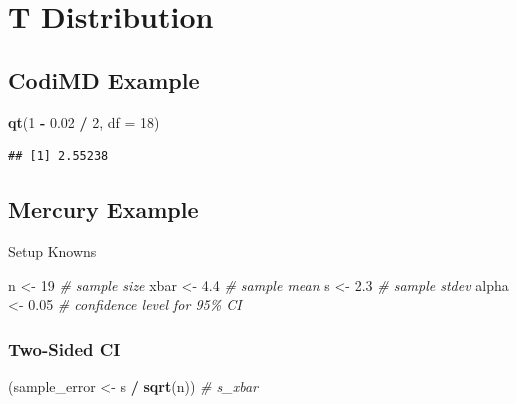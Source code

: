 \documentclass[
]{article}
\author{}
\date{\vspace{-2.5em}}
\newenvironment{Shaded}{\begin{snugshade}}{\end{snugshade}}
\newcommand{\AttributeTok}[1]{\textcolor[rgb]{0.13,0.29,0.53}{#1}}
\newcommand{\CommentTok}[1]{\textcolor[rgb]{0.56,0.35,0.01}{\textit{#1}}}
\newcommand{\DecValTok}[1]{\textcolor[rgb]{0.00,0.00,0.81}{#1}}
\newcommand{\FloatTok}[1]{\textcolor[rgb]{0.00,0.00,0.81}{#1}}
\newcommand{\FunctionTok}[1]{\textcolor[rgb]{0.13,0.29,0.53}{\textbf{#1}}}
\newcommand{\NormalTok}[1]{#1}
\newcommand{\OtherTok}[1]{\textcolor[rgb]{0.56,0.35,0.01}{#1}}
\newcommand{\SpecialCharTok}[1]{\textcolor[rgb]{0.81,0.36,0.00}{\textbf{#1}}}
\begin{document}
\section{T Distribution}\label{t-distribution}

\subsection{CodiMD Example}\label{codimd-example}

\begin{Shaded}
\begin{Highlighting}[]
\FunctionTok{qt}\NormalTok{(}\DecValTok{1} \SpecialCharTok{{-}} \FloatTok{0.02} \SpecialCharTok{/} \DecValTok{2}\NormalTok{, }\AttributeTok{df =} \DecValTok{18}\NormalTok{)}
\end{Highlighting}
\end{Shaded}

\begin{verbatim}
## [1] 2.55238
\end{verbatim}

\subsection{Mercury Example}\label{mercury-example}

Setup Knowns

\begin{Shaded}
\begin{Highlighting}[]
\NormalTok{n }\OtherTok{\textless{}{-}} \DecValTok{19} \CommentTok{\# sample size}
\NormalTok{xbar }\OtherTok{\textless{}{-}} \FloatTok{4.4} \CommentTok{\# sample mean}
\NormalTok{s }\OtherTok{\textless{}{-}} \FloatTok{2.3} \CommentTok{\# sample stdev}
\NormalTok{alpha }\OtherTok{\textless{}{-}} \FloatTok{0.05} \CommentTok{\# confidence level for 95\% CI}
\end{Highlighting}
\end{Shaded}

\subsubsection{Two-Sided CI}\label{two-sided-ci}

\begin{Shaded}
\begin{Highlighting}[]
\NormalTok{(sample\_error }\OtherTok{\textless{}{-}}\NormalTok{ s }\SpecialCharTok{/} \FunctionTok{sqrt}\NormalTok{(n)) }\CommentTok{\# s\_xbar}
\end{Highlighting}
\end{Shaded}
\end{document}
